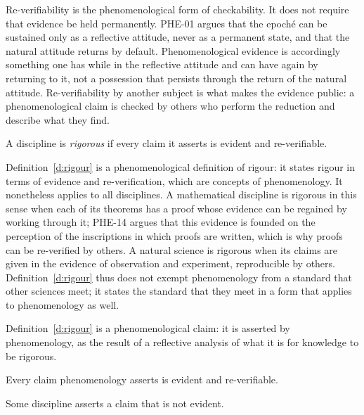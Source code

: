 \documentclass{situationist-preprint}
\begin{document}
Re-verifiability is the phenomenological form of checkability. It does not require that evidence be held permanently. PHE-01 argues that the epoché can be sustained only as a reflective attitude, never as a permanent state, and that the natural attitude returns by default. Phenomenological evidence is accordingly something one has while in the reflective attitude and can have again by returning to it, not a possession that persists through the return of the natural attitude. Re-verifiability by another subject is what makes the evidence public: a phenomenological claim is checked by others who perform the reduction and describe what they find.

\begin{definition}\label{d:rigour}
A discipline is \emph{rigorous} if every claim it asserts is evident and re-verifiable.
\end{definition}

Definition~\ref{d:rigour} is a phenomenological definition of rigour: it states rigour in terms of evidence and re-verification, which are concepts of phenomenology. It nonetheless applies to all disciplines. A mathematical discipline is rigorous in this sense when each of its theorems has a proof whose evidence can be regained by working through it; PHE-14 argues that this evidence is founded on the perception of the inscriptions in which proofs are written, which is why proofs can be re-verified by others. A natural science is rigorous when its claims are given in the evidence of observation and experiment, reproducible by others. Definition~\ref{d:rigour} thus does not exempt phenomenology from a standard that other sciences meet; it states the standard that they meet in a form that applies to phenomenology as well.

\begin{assumption}\label{a:defphen}
Definition~\ref{d:rigour} is a phenomenological claim: it is asserted by phenomenology, as the result of a reflective analysis of what it is for knowledge to be rigorous.
\end{assumption}

\begin{assumption}\label{a:phenevident}
Every claim phenomenology asserts is evident and re-verifiable.
\end{assumption}

\begin{assumption}\label{a:discr}
Some discipline asserts a claim that is not evident.
\end{assumption}
\end{document}
